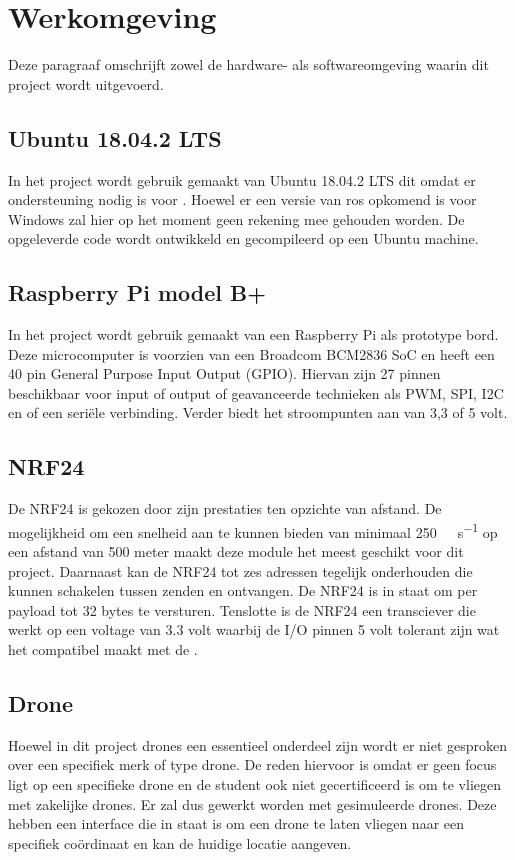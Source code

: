 \documentclass[a4paper, 11pt, oneside]{report}
\begin{document}
\section{Werkomgeving}
\label{inleiding:werkomgeving}
Deze paragraaf omschrijft zowel de hardware- als softwareomgeving waarin dit project wordt uitgevoerd. 

\subsection{Ubuntu 18.04.2 LTS}
\label{inleiding:werkomgeving:ubuntu}
In het project wordt gebruik gemaakt van Ubuntu 18.04.2 LTS dit omdat er ondersteuning nodig is voor .
Hoewel er een versie van ros opkomend is voor Windows zal hier op het moment geen rekening mee gehouden worden.
De opgeleverde code wordt ontwikkeld en gecompileerd op een Ubuntu machine.


\subsection{Raspberry Pi model B+}
\label{inleiding:werkomgeving:raspberrypi}

In het project wordt gebruik gemaakt van een Raspberry Pi als prototype bord.
Deze microcomputer is voorzien van een Broadcom BCM2836 SoC en heeft een 40 pin General Purpose Input Output (GPIO).
Hiervan zijn 27 pinnen beschikbaar voor input of output of geavanceerde technieken als PWM, SPI, I2C en of een seriële verbinding.
Verder biedt het stroompunten aan van 3,3 of 5 volt.


\subsection{NRF24}
\label{inleiding:werkomgeving:nrf24}
De NRF24 is gekozen door zijn prestaties ten opzichte van afstand.
De mogelijkheid om een snelheid aan te kunnen bieden van minimaal \SI{250}{\kilo\bit\per\second} op een afstand van 500 meter maakt deze module het meest geschikt voor dit project.
Daarnaast kan de NRF24 tot zes adressen tegelijk onderhouden die kunnen schakelen tussen zenden en ontvangen.
De NRF24 is in staat om per payload tot 32 bytes te versturen. 
Tenslotte is de NRF24 een transciever die werkt op een voltage van 3.3 volt waarbij de I/O pinnen 5 volt tolerant zijn wat het compatibel maakt met de .

\subsection{Drone}
\label{inleiding:werkomgeving:drone}
Hoewel in dit project drones een essentieel onderdeel zijn wordt er niet gesproken over een specifiek merk of type drone.
De reden hiervoor is omdat er geen focus ligt op een specifieke drone en de student ook niet gecertificeerd is om te vliegen met zakelijke drones.
Er zal dus gewerkt worden met gesimuleerde drones. 
Deze hebben een interface die in staat is om een drone te laten vliegen naar een specifiek coördinaat en kan de huidige locatie aangeven.
\end{document}
